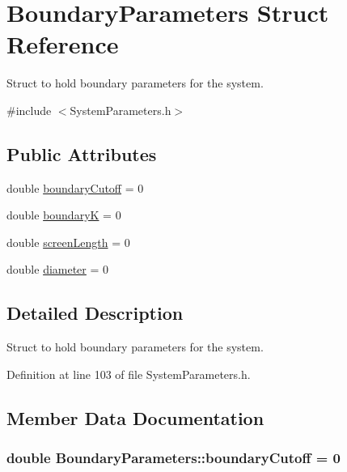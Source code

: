 \hypertarget{structBoundaryParameters}{\section{Boundary\+Parameters Struct Reference}
\label{structBoundaryParameters}
}


Struct to hold boundary parameters for the system.  




{\ttfamily \#include $<$System\+Parameters.\+h$>$}

\subsection*{Public Attributes}
\begin{DoxyCompactItemize}
\item 
double \hyperlink{structBoundaryParameters_a90e9efca0ade0a603523945c49056edd}{boundary\+Cutoff} = 0
\item 
double \hyperlink{structBoundaryParameters_aeb92b89caa0bf379a2dd1e26a032bb75}{boundary\+K} = 0
\item 
double \hyperlink{structBoundaryParameters_a75161f641debbb58f2829d8bba03b532}{screen\+Length} = 0
\item 
double \hyperlink{structBoundaryParameters_aff24f2bccaef825eff7c3181ec1cefcc}{diameter} = 0
\end{DoxyCompactItemize}


\subsection{Detailed Description}
Struct to hold boundary parameters for the system. 

Definition at line 103 of file System\+Parameters.\+h.



\subsection{Member Data Documentation}
\hypertarget{structBoundaryParameters_a90e9efca0ade0a603523945c49056edd}{
\subsubsection[{boundary\+Cutoff}]{\setlength{\rightskip}{0pt plus 5cm}double Boundary\+Parameters\+::boundary\+Cutoff = 0}}\label{structBoundaryParameters_a90e9efca0ade0a603523945c49056edd}


